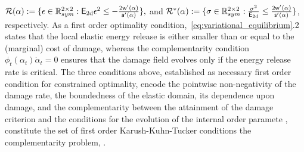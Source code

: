 $\mathcal{R}(\alpha):=\{\epsilon\in \mathbb R^{2\times 2}_{sym}: \mathsf{E_{\text{2d}}} \epsilon^2 \leq -\frac{2 \mathsf{w}'(\alpha)}{\mathsf{a}'(\alpha)}\},$ and $
    \mathcal{R}^*(\alpha):=\{\sigma\in \mathbb R^{2\times 2}_{sym}: \frac{\sigma^2}{\mathsf{E_{\text{2d}}}} \leq \frac{2 \mathsf{w}'(\alpha)}{\mathsf{s}'(\alpha)}\}$, respectively.
As a first order optimality condition,~\eqref{eq:variational_equilibrium}.2 states that the local elastic energy release is either smaller than or equal to the (marginal) cost of damage, whereas the complementarity condition $\phi_t(\alpha_t)\dot \alpha_t = 0$ ensures that the damage field evolves only if the energy release rate is critical.
The three conditions above, established as necessary first order condition for constrained optimality, encode the pointwise non-negativity of the damage rate, the boundedness of the elastic domain, its dependence upon damage, and the complementarity between the attainment of the damage criterion and the conditions for the evolution of the internal order paramete {, constitute the set of first order Karush-Kuhn-Tucker conditions the complementarity problem, \cite{x}}.

